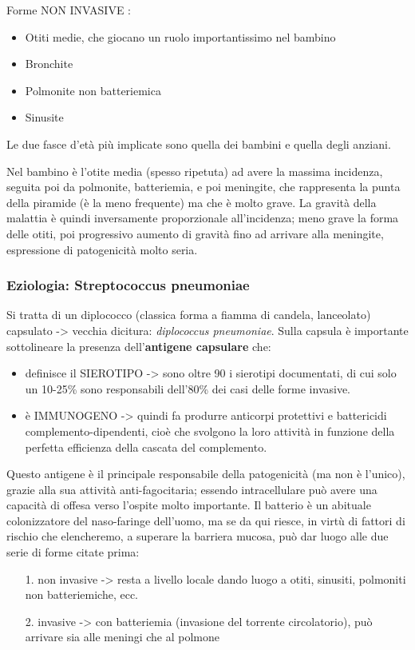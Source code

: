   Forme NON INVASIVE :

\begin{itemize}
\item
  Otiti medie, che giocano un ruolo importantissimo nel bambino
\item
  Bronchite
\item
  Polmonite non batteriemica
\item
  Sinusite
\end{itemize}
  Le due fasce d'età più implicate sono quella dei bambini e quella
  degli anziani.

  Nel bambino è l'otite media (spesso ripetuta) ad avere la massima
  incidenza, seguita poi da polmonite, batteriemia, e poi meningite, che
  rappresenta la punta della piramide (è la meno frequente) ma che è
  molto grave. La gravità della malattia è quindi inversamente
  proporzionale all'incidenza; meno grave la forma delle otiti, poi
  progressivo aumento di gravità fino ad arrivare alla meningite,
  espressione di patogenicità molto seria.

\subsubsection{Eziologia: Streptococcus pneumoniae}

  Si tratta di un diplococco (classica forma a fiamma di candela,
  lanceolato) capsulato -> vecchia dicitura: \emph{diplococcus
  pneumoniae}. Sulla capsula è importante sottolineare la presenza
  dell'\textbf{antigene capsulare} che:

\begin{itemize}
\item
  definisce il SIEROTIPO -> sono oltre 90 i sierotipi documentati, di cui
  solo un 10-25\% sono responsabili dell'80\% dei casi delle forme
  invasive.
\item
  è IMMUNOGENO -> quindi fa produrre anticorpi protettivi e battericidi
  complemento-dipendenti, cioè che svolgono la loro attività in funzione
  della perfetta efficienza della cascata del complemento.
\end{itemize}
  Questo antigene è il principale responsabile della patogenicità (ma
  non è l'unico), grazie alla sua attività anti-fagocitaria; essendo
  intracellulare può avere una capacità di offesa verso l'ospite molto
  importante. Il batterio è un abituale colonizzatore del naso-faringe
  dell'uomo, ma se da qui riesce, in virtù di fattori di rischio che
  elencheremo, a superare la barriera mucosa, può dar luogo alle due
  serie di forme citate prima:
\begin{itemize}
\item[1.] non invasive -> resta a livello locale dando luogo a otiti,
  sinusiti, polmoniti non batteriemiche, ecc.
\item[2.] invasive -> con batteriemia (invasione del torrente circolatorio),
  può arrivare sia alle meningi che al polmone
\end{itemize}

